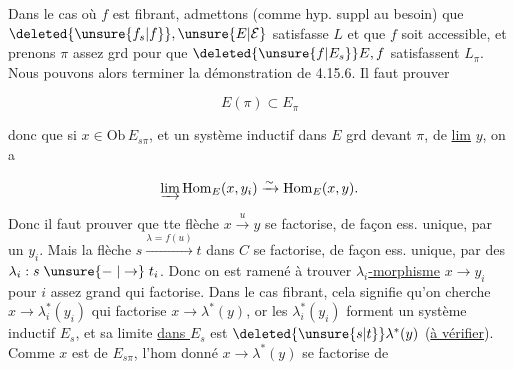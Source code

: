 

Dans le cas où $f$ est fibrant, admettons (comme hyp. suppl au besoin) que $\deleted{\unsure{f_s|f}},\unsure{E|\mathcal E}$ satisfasse $L$ et que $f$ soit accessible, et prenons $\pi$ assez grd pour que $\deleted{\unsure{f|E_s}}E,f$ satisfassent $L_\pi$. Nous pouvons alors terminer la démonstration de 4.15.6. Il faut prouver

\[ E(\pi)\subset E_\pi \]

donc que si $x\in\mathrm{Ob}\,E_{s\pi}$, et  un système inductif dans $E$ grd devant $\pi$, de \uline{lim} $y$, on a

\[ \varinjlim\mathrm{Hom}_{E}(x,y_i)\xrightarrow{\sim}\mathrm{Hom}_{E}(x,y). \]

Donc il faut prouver que tte flèche $x\xrightarrow{u}y$ se factorise, de façon ess. unique, par un $y_i$. Mais la flèche $s\xrightarrow{\lambda=f(u)}t$ dans $C$ se factorise, de façon ess. unique, par des $\lambda_i:s\mathrel{\unsure{\relbar|\to}}t_i$. Donc on est ramené à trouver  \uline{$\lambda_i$-morphisme} $x\longrightarrow y_i$ pour $i$ assez grand qui factorise. Dans le cas fibrant, cela signifie qu'on cherche $x\longrightarrow\lambda_i^*(y_i)$ qui factorise $x\longrightarrow\lambda^*(y)$, or les $\lambda_i^*(y_i)$ forment un système inductif  $E_s$, et sa limite \uline{dans $E_s$} est $\deleted{\unsure{s|t}}\lambda^*(y)$ (\uline{à vérifier}). Comme $x$ est de $E_{s\pi}$, l'hom donné $x\longrightarrow\lambda^*(y)$ se factorise de
